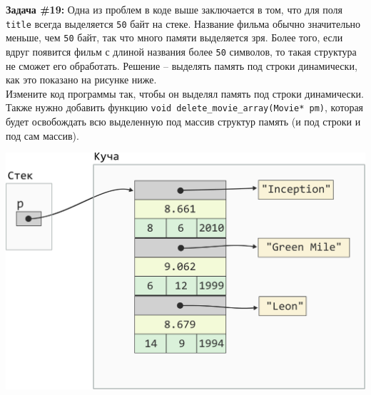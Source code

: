 \documentclass{article}
\begin{document}
\vspace{65ex}
\textbf{Задача \#19:} Одна из проблем в коде выше заключается в том, что для поля \texttt{title} всегда
выделяется \texttt{50} байт на стеке. Название фильма обычно значительно меньше, чем \texttt{50} байт, так что 
много памяти выделяется зря. Более того, если вдруг появится фильм с длиной названия более \texttt{50} символов, то такая структура не сможет его обработать. Решение -- выделять память под строки динамически, как это
показано на рисунке ниже. \\
Измените код программы так, чтобы он выделял память под строки 
динамически. Также нужно добавить функцию \texttt{void delete\_movie\_array(Movie* pm)}, которая будет
освобождать всю выделенную под массив структур память (и под строки и под сам массив).


\begin{center}
\includegraphics[scale=0.9]{../../images/pointer_schemes/pointer_to_array_of_struct_movie_charpointers.png}
\end{center}
\end{document}
